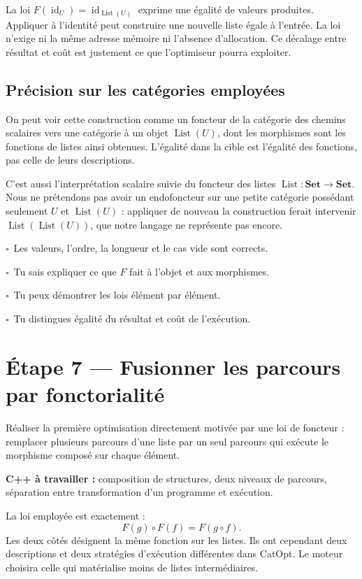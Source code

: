 \documentclass[11pt,a4paper]{article}
\newcommand{\code}[1]{\texttt{\detokenize{#1}}}
\newcommand{\Id}{\operatorname{id}}
\newcommand{\List}{\operatorname{List}}
\newcommand{\checkpoint}{\(\square\)\ }
\newcommand{\etape}[2]{\clearpage\section{Étape #1 — #2}}
\begin{document}
\begin{vigilance}
La loi \(F(\Id_U)=\Id_{\List(U)}\) exprime une égalité de valeurs produites.
Appliquer \code{map_values} à l'identité peut construire une nouvelle liste
égale à l'entrée. La loi n'exige ni la même adresse mémoire ni l'absence
d'allocation. Ce décalage entre résultat et coût est justement ce que
l'optimiseur pourra exploiter.
\end{vigilance}

\subsection{Précision sur les catégories employées}
On peut voir cette construction comme un foncteur de la catégorie des
chemins scalaires vers une catégorie à un objet \(\List(U)\), dont les
morphismes sont les fonctions de listes ainsi obtenues. L'égalité dans la
cible est l'égalité des fonctions, pas celle de leurs descriptions.

C'est aussi l'interprétation scalaire suivie du foncteur des listes
\(\List:\mathbf{Set}\to\mathbf{Set}\). Nous ne prétendons pas avoir un
endofoncteur sur une petite catégorie possédant seulement \(U\) et
\(\List(U)\) : appliquer de nouveau la construction ferait intervenir
\(\List(\List(U))\), que notre langage ne représente pas encore.

\begin{validation}
\checkpoint Les valeurs, l'ordre, la longueur et le cas vide sont corrects.\par
\checkpoint Tu sais expliquer ce que \(F\) fait à l'objet et aux morphismes.\par
\checkpoint Tu peux démontrer les lois élément par élément.\par
\checkpoint Tu distingues égalité du résultat et coût de l'exécution.
\end{validation}

\etape{7}{Fusionner les parcours par fonctorialité}
\label{sec:fusion}
\begin{objectif}
Réaliser la première optimisation directement motivée par une loi de
foncteur : remplacer plusieurs parcours d'une liste par un seul parcours
qui exécute le morphisme composé sur chaque élément.
\end{objectif}

\textbf{C++ à travailler :} composition de structures, deux niveaux de
parcours, séparation entre transformation d'un programme et exécution.

\begin{theorie}
La loi employée est exactement :
\[
\boxed{F(g)\circ F(f)=F(g\circ f).}
\]
Les deux côtés désignent la même fonction sur les listes. Ils ont cependant
deux descriptions et deux stratégies d'exécution différentes dans CatOpt.
Le moteur choisira celle qui matérialise moins de listes intermédiaires.
\end{theorie}
\end{document}
